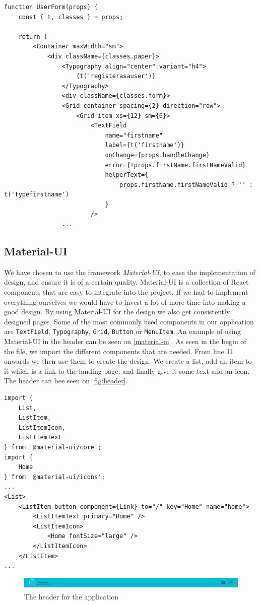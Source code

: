 \begin{lstlisting}[caption={Presentational component for userform}, captionpos=b, label={user-form}]
function UserForm(props) {
    const { t, classes } = props;
    
    return (
        <Container maxWidth="sm">
            <div className={classes.paper}>
                <Typography align="center" variant="h4">
                    {t('registerasauser')}
                </Typography>
                <div className={classes.form}>
                <Grid container spacing={2} direction="row">
                    <Grid item xs={12} sm={6}>
                        <TextField
                            name="firstname"
                            label={t('firstname')}
                            onChange={props.handleChange}
                            error={!props.firstName.firstNameValid}
                            helperText={
                                props.firstName.firstNameValid ? '' : t('typefirstname')
                            }
                        />
                ...
\end{lstlisting}

\subsection{Material-UI}
We have chosen to use the framework \textit{Material-UI}, to ease the implementation of design, and ensure it is of a certain quality.
Material-UI is a collection of React components that are easy to integrate into the project.
If we had to implement everything ourselves we would have to invest a lot of more time into making a good design.
By using Material-UI for the design we also get consistently designed pages.
Some of the most commonly used components in our application are \texttt{TextField}, \texttt{Typography}, \texttt{Grid}, \texttt{Button} or \texttt{MenuItem}.
An example of using Material-UI in the header can be seen on \autoref{material-ui}.
As seen in the begin of the file, we import the different components that are needed.
From line 11 onwards we then use them to create the design.
We create a list, add an item to it which is a link to the landing page, and finally give it some text and an icon.
The header can bee seen on \autoref{fig:header}.
\begin{lstlisting}[caption={Use of material-ui in the header}, captionpos=b, label={material-ui}]
import {
    List,
    ListItem,
    ListItemIcon,
    ListItemText
} from '@material-ui/core';
import {
	Home
} from '@material-ui/icons';
...
<List>
    <ListItem button component={Link} to="/" key="Home" name="home">
        <ListItemText primary="Home" />
        <ListItemIcon>
            <Home fontSize="large" />
        </ListItemIcon>
    </ListItem>
...
\end{lstlisting}


\begin{figure}[H]
    \includegraphics[width=\linewidth]{figures/header.png}
    \caption{The header for the application}
    \label{fig:header}
\end{figure}
  